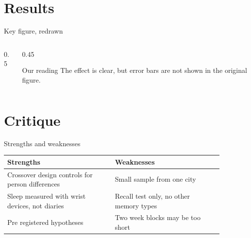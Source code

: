 \documentclass{beamer}
\begin{document}
\section{Results}
\begin{frame}{Key figure, redrawn}
  \begin{columns}[c]
    \begin{column}{0.5\textwidth}
      \centering
    \end{column}
    \begin{column}{0.45\textwidth}
      \begin{block}{Our reading}
        The effect is clear, but error bars are not shown in the original figure.
      \end{block}
    \end{column}
  \end{columns}
\end{frame}

\section{Critique}
\begin{frame}{Strengths and weaknesses}
  \small
  \begin{tabular}{>{\raggedright\arraybackslash}p{0.44\linewidth}>{\raggedright\arraybackslash}p{0.44\linewidth}}
    \toprule
    \textbf{Strengths} & \textbf{Weaknesses} \\
    \midrule
    Crossover design controls for person differences & Small sample from one city \\
    Sleep measured with wrist devices, not diaries & Recall test only, no other memory types \\
    Pre registered hypotheses & Two week blocks may be too short \\
    \bottomrule
  \end{tabular}
\end{frame}
\end{document}
